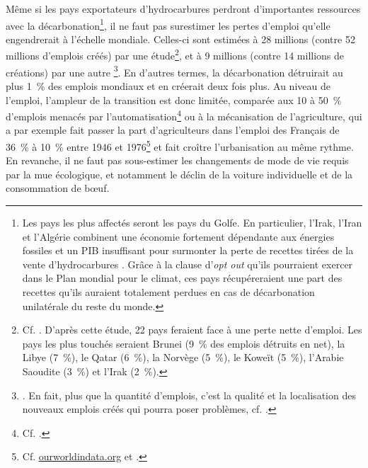 \documentclass[a5paper,french,openany]{memoir}
\begin{document}
Même si les pays exportateurs d'hydrocarbures perdront d'importantes ressources avec la décarbonation\footnote{Les pays les plus affectés seront les pays du Golfe. En particulier, l'Irak, l'Iran et l'Algérie combinent une économie fortement dépendante aux énergies fossiles et un PIB insuffisant pour surmonter la perte de recettes tirées de la vente d'hydrocarbures \citep{muttitt_equity_2020}. Grâce à la clause d'\textit{opt out} qu'ils pourraient exercer dans le Plan mondial pour le climat, ces pays récupéreraient une part des recettes qu'ils auraient totalement perdues en cas de décarbonation unilatérale du reste du monde.}, il ne faut pas surestimer les pertes d'emploi qu'elle engendrerait à l'échelle mondiale. Celles-ci sont estimées à 28 millions (contre 52 millions d'emplois créés) par une étude\footnote{Cf. \cite{jacobson_100_2017}. D'après cette étude, 22 pays feraient face à une perte nette d'emploi. Les pays les plus touchés seraient Brunei (9~\% des emplois détruits en net), la Libye (7~\%), le Qatar (6~\%), la Norvège (5~\%), le Koweït (5~\%), l'Arabie Saoudite (3~\%) et l'Irak (2~\%).}, et à 9 millions (contre 14 millions de créations) par une autre
\footnote{\cite{pai_meeting_2021}. En fait, plus que la quantité d'emplois, c'est la qualité et la localisation des nouveaux emplois créés qui pourra poser problèmes, cf. \cite{haywood_welfare_2021}.}. En d'autres termes, la décarbonation détruirait au plus 1~\% des emplois mondiaux et en créerait deux fois plus. Au niveau de l'emploi, l'ampleur de la transition est donc limitée, comparée aux 10 à 50~\% d'emplois menacés par l'automatisation\footnote{Cf. \cite{frey_future_2017,lassebie_what_2022,hatzius_global_2023}.} ou à la mécanisation de l'agriculture, qui a par exemple fait passer la part d'agriculteurs dans l'emploi des Français de 36~\% à 10~\% entre 1946 et 1976\footnote{Cf. \href{https://ourworldindata.org/grapher/urbanization-last-500-years?country=~FRA}{ourworldindata.org} et \href{https://ourworldindata.org/grapher/share-of-the-labor-force-employed-in-agriculture?tab=chart&time=1800..latest&country=FRA}{\cite{herrendorf_chapter_2014}}.} et fait croître l'urbanisation au même rythme. En revanche, il ne faut pas sous-estimer les changements de mode de vie requis par la mue écologique, et notamment le déclin de la voiture individuelle et de la consommation de bœuf.
\end{document}
